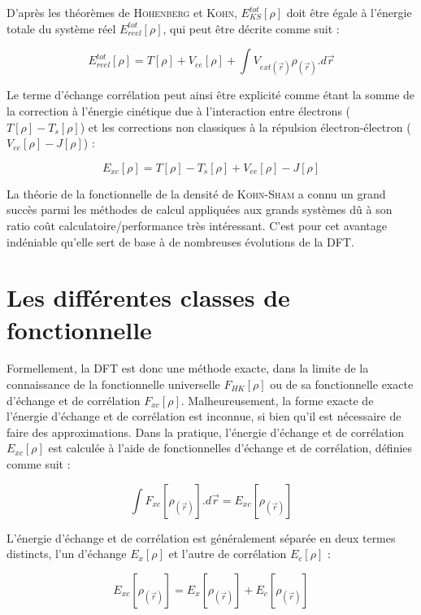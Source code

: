 D'après les théorèmes de \textsc{Hohenberg} et \textsc{Kohn}, $E_{KS}^{tot}[\rho]$ doit être égale à l'énergie totale du système réel $E_{reel}^{tot}[\rho]$, qui peut être décrite comme suit :

\begin{equation}
E_{reel}^{tot}[\rho] = T[\rho] + V_{ee}[\rho] + \int V_{ext(\vec{r})}\rho_{(\vec{r})} .d\vec{r}
\end{equation}

Le terme d'échange corrélation peut ainsi être explicité comme étant la somme de la correction à l'énergie cinétique due à l'interaction entre électrons ($T[\rho] - T_{s}[\rho]$) et les corrections non classiques à la répulsion électron-électron ($V_{ee}[\rho] - J[\rho]$) :

\begin{equation}
E_{xc}[\rho] = T[\rho] - T_{s}[\rho] + V_{ee}[\rho] - J[\rho]
\end{equation}

La théorie de la fonctionnelle de la densité de \textsc{Kohn-Sham} a connu un grand succès parmi les méthodes de calcul appliquées aux grands systèmes dû à son ratio coût calculatoire/performance très intéressant. C'est pour cet avantage indéniable qu'elle sert de base à de nombreuses évolutions de la DFT.

\section{Les différentes classes de fonctionnelle}

Formellement, la DFT est donc une méthode exacte, dans la limite de la connaissance de la fonctionnelle universelle $F_{HK}[\rho]$ ou de sa fonctionnelle exacte d’échange et de corrélation $F_{xc}[\rho]$. Malheureusement, la forme exacte de l’énergie d’échange et de corrélation est inconnue, si bien qu’il est nécessaire de faire des approximations. Dans la pratique, l’énergie d’échange et de corrélation $E_{xc}[\rho]$ est calculée à l’aide de fonctionnelles d’échange et de corrélation, définies comme suit :

\begin{equation}
\int F_{xc}[\rho_{(\vec{r})}].d\vec{r} = E_{xc}[\rho_{(\vec{r})}]
\end{equation}

L’énergie d’échange et de corrélation est généralement séparée en deux termes distincts, l’un d’échange $E_{x}[\rho]$ et l’autre de corrélation $E_{c}[\rho]$ :

\begin{equation}
E_{xc}[\rho_{(\vec{r})}] = E_{x}[\rho_{(\vec{r})}] + E_{c}[\rho_{(\vec{r})}]
\end{equation}


